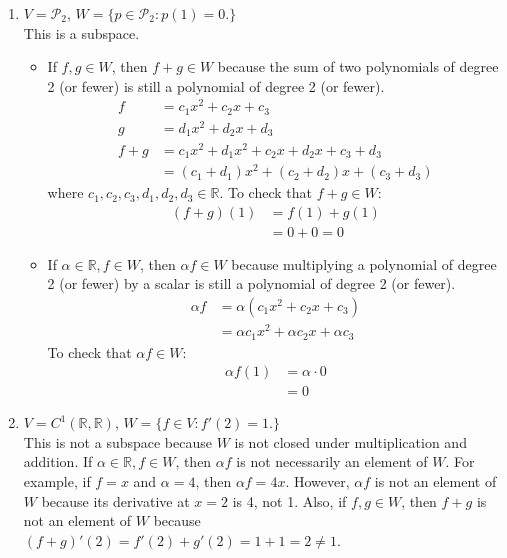 \documentclass[11pt]{amsart}
\theoremstyle{plain}
\theoremstyle{definition}
\begin{document}
\begin{enumerate}
\begin{enumerate}
\item $V = \mathcal{P}_2$, $W = \{p \in \mathcal{P}_2 : p(1) = 0.\}$ \\
This is a subspace. 
\begin{itemize}
	\item If $f, g \in W$, then $f + g \in W$ because the sum of two polynomials of degree 2 (or fewer) is still a polynomial of degree 2 (or fewer). 
	\begin{align} \nonumber
		f &= c_1x^2 + c_2x + c_3 \\ \nonumber
		g &= d_1x^2 + d_2x + d_3 \\ \nonumber
		f + g &= c_1x^2 + d_1x^2 + c_2x + d_2x + c_3 + d_3 \\ \nonumber
				&= (c_1 + d_1)x^2 + (c_2 + d_2)x + (c_3 + d_3)
	\end{align}
	where $c_1, c_2, c_3, d_1, d_2, d_3 \in \mathbb{R}$. To check that $f + g \in W$: 
	\begin{align} \nonumber
	(f + g)(1) &= f(1) + g(1) \\ \nonumber
				&= 0 + 0 = 0
	\end{align}
	\item If $\alpha \in \mathbb{R}, f \in W$, then $\alpha f \in W$ because multiplying a polynomial of degree 2 (or fewer) by a scalar is still a polynomial of degree 2 (or fewer). 
	\begin{align} \nonumber
	\alpha f &= \alpha (c_1x^2 + c_2x + c_3) \\ \nonumber
				&= \alpha c_1x^2 + \alpha c_2x + \alpha c_3
	\end{align}
	To check that $\alpha f \in W$:
	\begin{align} \nonumber
	\alpha f(1) &= \alpha \cdot 0 \\ \nonumber
				&= 0
	\end{align}
\end{itemize}

\item $V = C^{1}(\mathbb{R}, \mathbb{R})$, $W = \{f\in V: f'(2) = 1.\}$ \\
This is not a subspace because $W$ is not closed under multiplication and addition. If $\alpha \in \mathbb{R}, f \in W$, then $\alpha f$ is not necessarily an element of $W$. For example, if $f = x$ and $\alpha = 4$, then $\alpha f = 4x$. However, $\alpha f$ is not an element of $W$ because its derivative at $x = 2$ is 4, not 1. Also, if $f, g \in W$, then $f + g$ is not an element of $W$ because $(f + g)'(2) = f'(2) + g'(2) = 1 + 1 = 2 \neq 1$. 
\end{enumerate}


\end{enumerate}
\end{document}

